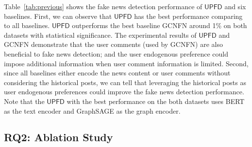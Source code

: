\documentclass[sigconf]{acmart}
\newcommand\UPFD{$\mathsf{UPFD}$\xspace}
\begin{document}
Table~\ref{tab:previous} shows the fake news detection performance of \UPFD and six baselines.
First, we can observe that \UPFD has the best performance comparing to all baselines.
\UPFD outperforms the best baseline GCNFN around 1\% on both datasets with statistical significance.
The experimental results of \UPFD and GCNFN demonstrate that the user comments (used by GCNFN) are also beneficial to fake news detection; and the user endogenous preference could impose additional information when user comment information is limited.
Second, since all baselines either encode the news content or user comments without considering the historical posts,
we can tell that leveraging the historical posts as user endogenous preferences could improve the fake news detection performance.
Note that the \UPFD with the best performance on the both datasets uses BERT as the text encoder and GraphSAGE as the graph encoder.



\begin{table}[h]
\centering
\caption{Fake news detection performance on two datasets with different node feature types and models. The bold (underlined) text indicates the best (second best) performances on each dataset.}
\label{tab:overall}
\end{table} 




\subsection{RQ2: Ablation Study}
\end{document}
